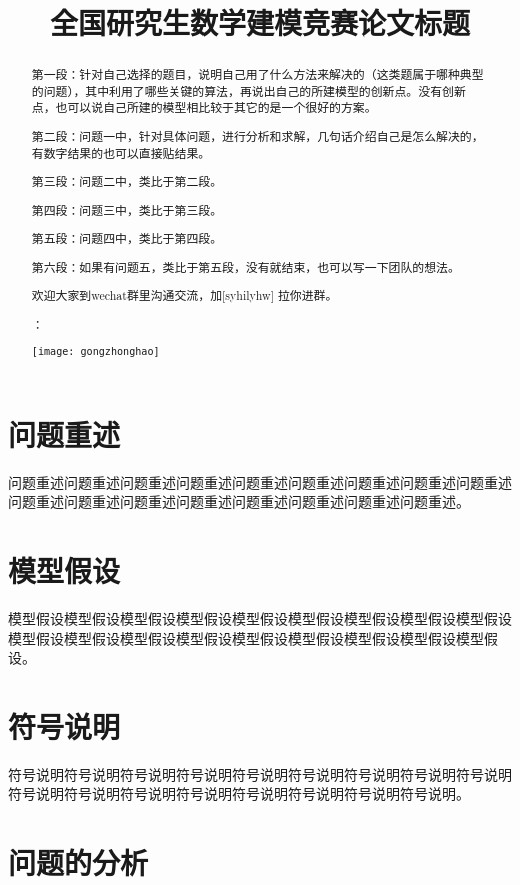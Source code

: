 \documentclass[bwprint]{gmcmthesis}
\title{全国研究生数学建模竞赛论文标题}
\begin{document}
 \maketitle
 \begin{abstract}
第一段：针对自己选择的题目，说明自己用了什么方法来解决的（这类题属于哪种典型的问题），其中利用了哪些关键的算法，再说出自己的所建模型的创新点。没有创新点，也可以说自己所建的模型相比较于其它的是一个很好的方案。

第二段：问题一中，针对具体问题，进行分析和求解，几句话介绍自己是怎么解决的，有数字结果的也可以直接贴结果。

第三段：问题二中，类比于第二段。

第四段：问题三中，类比于第三段。

第五段：问题四中，类比于第四段。

第六段：如果有问题五，类比于第五段，没有就结束，也可以写一下团队的想法。

欢迎大家到wechat群里沟通交流，加[syhilyhw] 拉你进群。


：

\centerline{\texttt{[image: gongzhonghao]}}


\end{abstract}


\tableofcontents

\section{问题重述}
问题重述问题重述问题重述问题重述问题重述问题重述问题重述问题重述问题重述问题重述问题重述问题重述问题重述问题重述问题重述问题重述问题重述。
\section{模型假设}
模型假设模型假设模型假设模型假设模型假设模型假设模型假设模型假设模型假设模型假设模型假设模型假设模型假设模型假设模型假设模型假设模型假设模型假设。
\section{符号说明}
符号说明符号说明符号说明符号说明符号说明符号说明符号说明符号说明符号说明符号说明符号说明符号说明符号说明符号说明符号说明符号说明符号说明。
\section{问题的分析}
\end{document}
